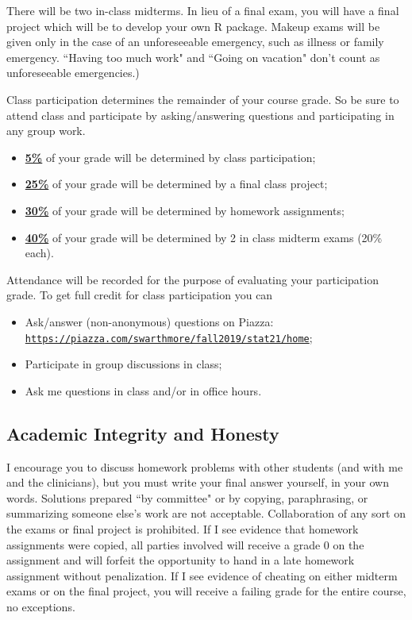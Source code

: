 \documentclass[11pt]{article}
\begin{document}
 There will be two in-class midterms. In lieu of a final exam, you will have a final project which will be to develop your own R package. Makeup exams will be given only in the case of an unforeseeable emergency, such as illness or family emergency. ``Having too much work" and ``Going on vacation" don't count as unforeseeable emergencies.) 


 Class participation determines the remainder of your course grade. So be sure to attend class and participate by asking/answering questions and participating in any group work. 

	\begin{itemize}
		\item \underline{\textbf{5\%}} of your grade will be determined by class participation;
		\item \underline{\textbf{25\%}} of your grade will be determined by a final class project;
		\item \underline{\textbf{30\%}} of your grade will be determined by homework assignments;
		\item \underline{\textbf{40\%}} of your grade will be determined by 2 in class midterm exams (20\% each).
	\end{itemize}


Attendance will be recorded for the purpose of evaluating your participation grade. To get full credit for class participation you can 
\begin{itemize}
	\item Ask/answer (non-anonymous) questions on Piazza:\\ \href{https://piazza.com/swarthmore/fall2019/stat21/home}{\tt https://piazza.com/swarthmore/fall2019/stat21/home};
	\item Participate in group discussions in class;
	\item Ask me questions in class and/or in office hours.
\end{itemize}
	

	\subsection*{Academic Integrity and Honesty}
	I encourage you to discuss homework problems with other students (and with me and the clinicians), but you must write your final answer yourself, in your own words. Solutions prepared ``by committee" or by copying, paraphrasing, or summarizing someone else's work are not acceptable. Collaboration of any sort on the exams or final project is prohibited. If I see evidence that homework assignments were copied, all parties involved will receive a grade $0$ on the assignment and will forfeit the opportunity to hand in a late homework assignment without penalization. If I see evidence of cheating on either midterm exams or on the final project, you will receive a failing grade for the entire course, no exceptions. 
	
\end{document}
